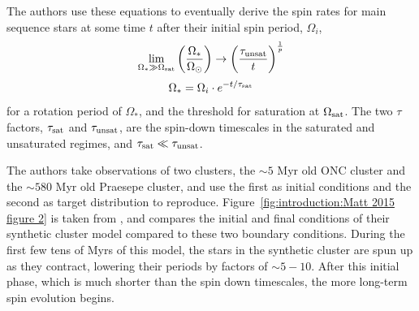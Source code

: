 The authors use these equations to eventually derive the spin rates for main sequence stars at some time $t$ after their initial spin period, $\Omega_i$, 
\begin{equation}
    \lim_{\Omega_* \gg \Omega_{\rm sat}} \bigg(\frac{\Omega_*}{\Omega_\odot}\bigg) \rightarrow \bigg(\frac{\tau_{\rm unsat}}{t}\bigg)^{\frac{1}{p}}
\end{equation}
\begin{equation}
    \Omega_* = \Omega_i \cdot e^{-t/\tau_{\rm sat}}
\end{equation}
for a rotation period of $\Omega_*$, and the threshold for saturation at $\Omega_{\rm sat}$. The two $\tau$ factors, $\tau_{\rm sat}$ and $\tau_{\rm unsat}$, are the spin-down timescales in the saturated and unsaturated regimes, and $\tau_{\rm sat} \ll \tau_{\rm unsat}$.

The authors take observations of two clusters, the $\sim 5$ Myr old ONC cluster and the $\sim 580$ Myr old Praesepe cluster, and use the first as initial conditions and the second as target distribution to reproduce. Figure~\ref{fig:introduction:Matt 2015 figure 2} is taken from \citet{matt2015}, and compares the initial and final conditions of their synthetic cluster model compared to these two boundary conditions. During the first few tens of Myrs of this model, the stars in the synthetic cluster are spun up as they contract, lowering their periods by factors of $\sim 5-10$. After this initial phase, which is much shorter than the spin down timescales, the more long-term spin evolution begins.

